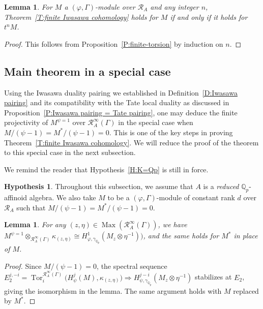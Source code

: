 \documentclass[12pt]{article}
\newtheorem{lemma}[theorem]{Lemma}
\theoremstyle{definition}
\newtheorem{hypothesis}[theorem]{Hypothesis}
\numberwithin{equation}{theorem}
\newcommand{\calR}{\mathcal{R}}
\newcommand{\QQ}{\mathbb{Q}}
\def\Qp{\QQ_p}
\DeclareMathOperator{\Max}{Max}
\DeclareMathOperator{\Tor}{Tor}
\begin{document}
\begin{lemma}
\label{L:twist by t}
For $M$ a $(\varphi, \Gamma)$-module over $\calR_A$ and any integer $n$,
Theorem~\ref{T:finite Iwasawa cohomology} holds for $M$ if and only if it holds for $t^nM$.
\end{lemma}
\begin{proof}
This follows from Proposition~\ref{P:finite-torsion} by induction on $n$.
\end{proof}



\subsection{Main theorem in a special case}

Using the Iwasawa duality pairing we established in Definition~\ref{D:Iwasawa pairing} and its compatibility with the Tate local duality as discussed in Proposition~\ref{P:Iwasawa pairing = Tate pairing}, one may deduce the finite projectivity of $M^{\psi=1}$ over $\calR_A^\infty(\Gamma)$ in the special case when $M/(\psi-1) =  M^*/(\psi-1) = 0$.  This is one of the key steps in proving Theorem~\ref{T:finite Iwasawa cohomology}.  We will reduce the proof of the theorem to this special case in the next subsection.

We remind the reader that Hypothesis~\ref{H:K=Qp} is still in force.

\begin{hypothesis}\label{H:reduced vanishing H2Iw}
Throughout this subsection, we assume that $A$ is a \emph{reduced} $\Qp$-affinoid algebra. 
We also take $M$ to be
a $(\varphi, \Gamma)$-module of constant rank $d$ over $\calR_A$ such that $M / (\psi-1) = M^*/(\psi-1)=0$.
\end{hypothesis}


\begin{lemma}
\label{L:lifting elements in M^psi=1}
For any $(z, \eta) \in \Max(\calR_A^\infty(\Gamma))$, we have $M^{\psi=1} \otimes_{\calR_A^\infty(\Gamma)} \kappa_{(z, \eta)} \cong H^1_{\varphi, \gamma_{\Qp}}(M_z \otimes \eta^{-1}))$, and the same holds for $M^*$ in place of $M$.
\end{lemma}
\begin{proof}
Since $M / (\psi-1)=0$, the spectral sequence $E_2^{j,-i} =\Tor^{\calR_A^\infty(\Gamma)}_i \big(H^j_{\psi}(M), \kappa_{(z, \eta)} \big) \Rightarrow H^{j-i}_{\psi, \gamma_{\Qp}}(M_z \otimes \eta^{-1})$  stabilizes at $E_2$, giving the isomorphism in the lemma.  The same argument holds with $M$ replaced by $M^*$.
\end{proof}
\end{document}
